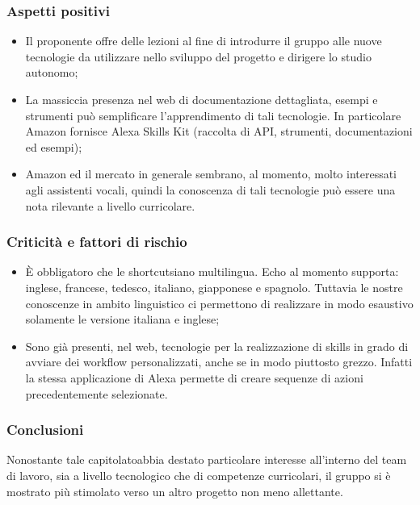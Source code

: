 \subsubsection{Aspetti positivi}
\begin{itemize}
    \item Il proponente offre delle lezioni al fine di introdurre il gruppo alle 
nuove tecnologie da utilizzare nello sviluppo del progetto e dirigere lo studio 
autonomo;
    \item La massiccia presenza nel web di documentazione dettagliata, esempi e 
strumenti può semplificare l'apprendimento di tali tecnologie. In 
particolare Amazon fornisce Alexa Skills Kit (raccolta di API\glo, 
strumenti, documentazioni ed esempi);
    \item Amazon ed il mercato in generale sembrano, al momento, molto interessati 
agli assistenti vocali, quindi la conoscenza di tali tecnologie può essere una 
nota rilevante a livello curricolare.
\end{itemize}
\subsubsection{Criticità e fattori di rischio}
\begin{itemize}
    \item \`E obbligatoro che le shortcut\glosp siano multilingua. Echo al momento 
supporta: inglese, francese, tedesco, italiano, giapponese e spagnolo. Tuttavia 
le nostre conoscenze in ambito linguistico ci permettono di realizzare in modo 
esaustivo solamente le versione italiana e inglese;
    \item Sono già presenti, nel web, tecnologie per la realizzazione di skills\glo{} in 
    grado di avviare dei workflow\glo{} personalizzati, anche se in modo piuttosto grezzo.
    Infatti la stessa applicazione di Alexa permette di creare sequenze di azioni precedentemente 
selezionate.
 
\end{itemize}
\subsubsection{Conclusioni}
Nonostante tale capitolato\glosp abbia destato particolare interesse all'interno del 
team di lavoro, sia a livello tecnologico che di competenze curricolari, il 
gruppo si è mostrato più stimolato verso un altro progetto non meno allettante.


